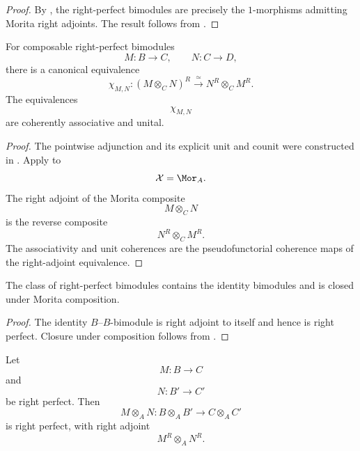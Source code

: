 \begin{proof}
By
,
the right-perfect bimodules are precisely the $1$-morphisms admitting
Morita right adjoints. The result follows from
.
\end{proof}

\begin{proposition}
\label{prop:coherent-adjoints-composites}
For composable right-perfect bimodules
\[
    M
    \colon
    B
    \longrightarrow
    C,
    \qquad
    N
    \colon
    C
    \longrightarrow
    D,
\]
there is a canonical equivalence
\[
    \chi_{M,N}
    \colon
    (M\otimes_C N)^R
    \xrightarrow{\;\simeq\;}
    N^R\otimes_C M^R.
\]
The equivalences
\[
    \chi_{M,N}
\]
are coherently associative and unital.
\end{proposition}

\begin{proof}
The pointwise adjunction and its explicit unit and counit were constructed
in
. Apply
to
\[
    \mathcal X=\Mor_A.
\]
The right adjoint of the Morita composite
\[
    M\otimes_C N
\]
is the reverse composite
\[
    N^R\otimes_C M^R.
\]
The associativity and unit coherences are the pseudofunctorial coherence
maps of the right-adjoint equivalence.
\end{proof}

\begin{proposition}
\label{prop:right-perfect-morita-closure}
The class of right-perfect bimodules contains the identity bimodules and
is closed under Morita composition.
\end{proposition}

\begin{proof}
The identity $B$--$B$-bimodule is right adjoint to itself and hence is
right perfect. Closure under composition follows from
.
\end{proof}

\begin{proposition}
\label{prop:external-tensor-right-perfect}
Let
\[
    M
    \colon
    B
    \longrightarrow
    C
\]
and
\[
    N
    \colon
    B'
    \longrightarrow
    C'
\]
be right perfect. Then
\[
    M\otimes_A N
    \colon
    B\otimes_A B'
    \longrightarrow
    C\otimes_A C'
\]
is right perfect, with right adjoint
\[
    M^R\otimes_A N^R.
\]
\end{proposition}

